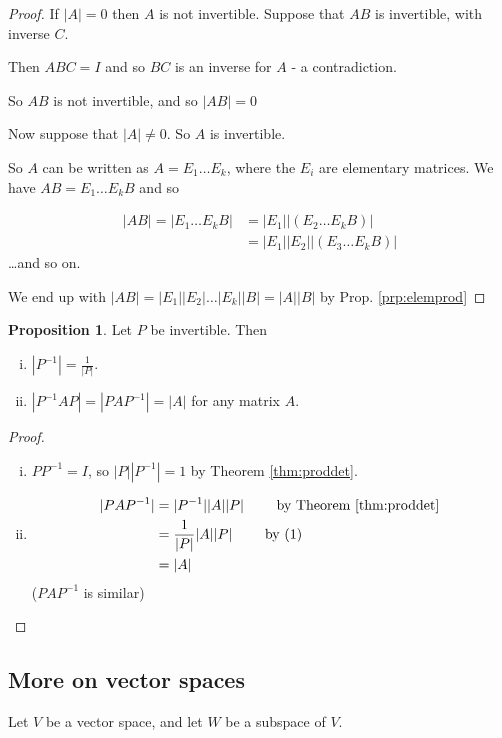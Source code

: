 \documentclass{article}
\theoremstyle{definition} \newtheorem*{definition}{Definition}
\newtheorem{proposition}[theorem]{Proposition}
\newcommand{\Det}[1]{|#1|}
\begin{document}
  \begin{proof}
    If $\Det{A}=0$ then $A$ is not invertible. Suppose that $AB$ is
    invertible, with inverse $C$. 

    Then $ABC=I$ and so $BC$ is an inverse for $A$ - a contradiction.

    So $AB$ is not invertible, and so $\Det{AB}=0$

    Now suppose that $\Det{A}\neq 0$. So $A$ is invertible.

    So $A$ can be written as $A = E_1 \dots E_k$, where the $E_i$
    are elementary matrices. We have $AB = E_1 \dots E_k B$ and so

\begin{align*}
  |AB| = |E_1 \dots E_k B| &= |E_1| |\left( E_2 \dots E_k B\right)| \\
  &= |E_1||E_2||\left( E_3 \dots E_k B \right)|
\end{align*} \dots and so on.

We end up with $|AB| = |E_1||E_2| \dots |E_k| |B| = |A||B|$ by Prop. \ref{prp:elemprod}
  \end{proof}


  \begin{proposition}
    Let $P$ be invertible. Then 
    \begin{enumerate}[(i)]
      \item $|P^{-1}| = \frac{1}{|P|}$.
      \item $|P^{-1}AP| = |PAP^{-1}| = |A|$ for any matrix $A$.
    \end{enumerate}
    \label{prp:pap}
  \end{proposition}

  \begin{proof}\hfill
    \begin{enumerate}[(i)]
      \item $PP^{-1} = I$, so $|P||P^{-1}| = 1$ by Theorem \ref{thm:proddet}.
      \item 
        \begin{align*}
          |PAP^{-1}| &= |P^{-1}||A||P| 
          \qquad \text{ by Theorem \ref{thm:proddet} }\\
          &= \frac{1}{|P|}|A||P| \qquad\text{ by } (1)\\
          &= |A|
        \end{align*} ($PAP^{-1}$ is similar)
    \end{enumerate}
  \end{proof}


  \subsection*{More on vector spaces}
  Let $V$ be a vector space, and let $W$ be a subspace of $V$.
\end{document}
